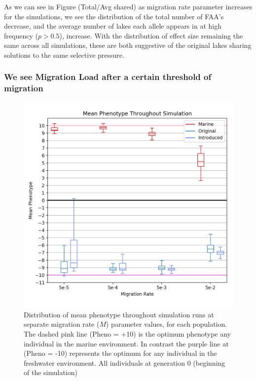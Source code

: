 \documentclass{article}
\begin{document}
As we can see in Figure (Total/Avg shared)
as migration rate parameter increases for the simulations, 
we see the distribution of the total number of FAA's decrease, and 
the average number of lakes each allele appears in at high frequency ($p > 0.5$), increase.
With the distribution of effect size remaining the same across all simulations, 
these are both suggestive of the original lakes sharing solutions to the same selective pressure.



\subsubsection*{We see Migration Load after a certain threshold of migration}

\begin{figure}[h!tb]
	\begin{center}
  		\includegraphics[width=0.8\linewidth]{matplotlib/MeanPhenotype1.png}
  		\caption{Distribution of mean phenotype throughout simulation runs at separate migration rate ($M$) parameter values, for each population.
		The dashed pink line (Pheno = +10) is the optimum phenotype any individual in the marine environment.
		In contrast the purple line at (Pheno = -10) represents the optimum for any individual in the freshwater environment. 
		All individuals at generation 0 (beginning of the simulation) 
		}
  		\label{fig:MeanPhenotype}
	\end{center}
\end{figure}
\end{document}
